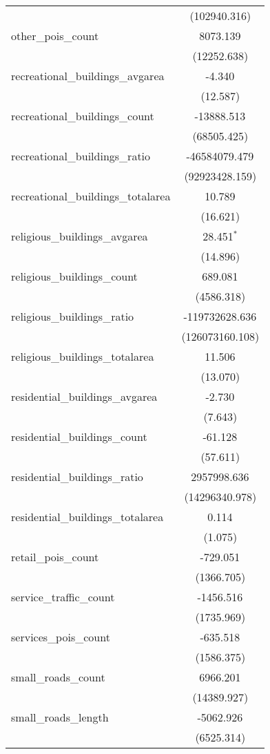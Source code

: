 \begin{table}[!htbp]
\begin{tabular}{@{\extracolsep{5pt}}lc}
  & (102940.316) \\
 other_pois_count & 8073.139$^{}$ \\
  & (12252.638) \\
 recreational_buildings_avgarea & -4.340$^{}$ \\
  & (12.587) \\
 recreational_buildings_count & -13888.513$^{}$ \\
  & (68505.425) \\
 recreational_buildings_ratio & -46584079.479$^{}$ \\
  & (92923428.159) \\
 recreational_buildings_totalarea & 10.789$^{}$ \\
  & (16.621) \\
 religious_buildings_avgarea & 28.451$^{*}$ \\
  & (14.896) \\
 religious_buildings_count & 689.081$^{}$ \\
  & (4586.318) \\
 religious_buildings_ratio & -119732628.636$^{}$ \\
  & (126073160.108) \\
 religious_buildings_totalarea & 11.506$^{}$ \\
  & (13.070) \\
 residential_buildings_avgarea & -2.730$^{}$ \\
  & (7.643) \\
 residential_buildings_count & -61.128$^{}$ \\
  & (57.611) \\
 residential_buildings_ratio & 2957998.636$^{}$ \\
  & (14296340.978) \\
 residential_buildings_totalarea & 0.114$^{}$ \\
  & (1.075) \\
 retail_pois_count & -729.051$^{}$ \\
  & (1366.705) \\
 service_traffic_count & -1456.516$^{}$ \\
  & (1735.969) \\
 services_pois_count & -635.518$^{}$ \\
  & (1586.375) \\
 small_roads_count & 6966.201$^{}$ \\
  & (14389.927) \\
 small_roads_length & -5062.926$^{}$ \\
  & (6525.314) \\

\end{tabular}
\end{table}
